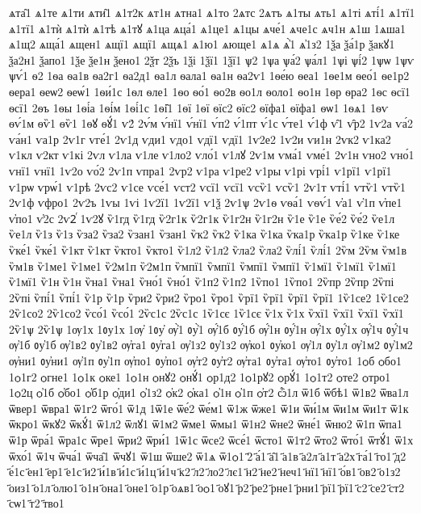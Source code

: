 {ѧта̑1
ѧ1те
ѧ1ти
ѧти̑1
ѧ1т2к
ѧт1н
ѧтна1
ѧ1то
2ѧтс
2ѧтъ
ѧ1ты
ѧть1
ѧ1ті
ѧті́1
ѧ1тї1
ѧ1тї1
ѧ1тѝ
ѧ1тѝ
ѧ1тѣ
ѧ1тꙋ
ѧ1ца
ѧца́1
ѧ1це1
ѧ1цы
ѧче́1
ѧче1с
ѧч1н
ѧ1ш
1ѧша1
ѧ1щ2
ѧща́1
ѧщен1
ѧщї1
ѧщї1
ѧщѧ1
ѧ1ю1
ѧюще1
ѧ1ѧ
ѧ҆̀1
ѧ҆1з2
1ѯа
ѯа́1р
ѯакꙋ1
ѯа2н1
ѯапо1
1ѯе
ѯе1н
ѯено1
2ѯт
2ѯъ
1ѯі
1ѯї1
1ѯї1
ѱ2
1ѱа
ѱа́2
ѱа́л1
1ѱі
ѱі́2
1ѱѡ
1ѱѵ
ѱѵ́1
ѳ2
1ѳа
ѳа1в
ѳа2г1
ѳа2д1
ѳа1л
ѳала1
ѳа1н
ѳа2ѵ1
1ѳе́ю
ѳеа1
1ѳе1м
ѳео́1
ѳе1р2
ѳера1
ѳеѡ2
ѳеѡ́1
1ѳи́1с
1ѳл
ѳле1
1ѳо
ѳо́1
ѳо2в
ѳо1л
ѳоло1
ѳо1н
1ѳр
ѳра2
1ѳс
ѳсї1
ѳсї1
2ѳъ
1ѳы
1ѳі́а
1ѳі́м
1ѳі́1с
1ѳі̑1
1ѳї
1ѳї
ѳїс2
ѳїс2
ѳїфа1
ѳїфа1
ѳѡ1
1ѳѧ1
1ѳѵ
ѳѵ́1м
ѳѷ1
ѳѷ1
1ѳꙋ
ѳꙋ́1
ѵ2́
2ѵ́м
ѵ́нї1
ѵ́нї1
ѵ́п2
ѵ́1пт
ѵ́1с
ѵ́те1
ѵ́1ф
ѵ̑1
ѵ̑р2
1ѵ2а
ѵа́2
ѵа́н1
ѵа1р
2ѵ1г
ѵге́1
2ѵ1д
ѵди1
ѵдо1
ѵдї1
ѵдї1
1ѵ2е2
1ѵ2и
ѵи1н
2ѵк2
ѵ1ка2
ѵ1кл
ѵ2кт
ѵ1кі
2ѵл
ѵ1ла
ѵ1ле
ѵ1ло2
ѵло́1
ѵ1лꙋ
2ѵ1м
ѵма́1
ѵме́1
2ѵ1н
ѵно2
ѵно́1
ѵнї1
ѵнї1
1ѵ2о
ѵо́2
2ѵ1п
ѵпра1
2ѵр2
ѵ1ра
ѵ1ре2
ѵ1ры
ѵ1рі
ѵрі́1
ѵ1рї1
ѵ1рї1
ѵ1рѡ
ѵрѡ́1
ѵ1рѣ
2ѵс2
ѵ1се
ѵсе́1
ѵст2
ѵсї1
ѵсї1
ѵсѷ1
ѵсѷ1
2ѵ1т
ѵті́1
ѵтѷ1
ѵтѷ1
2ѵ1ф
ѵфро1
2ѵ2ъ
1ѵы
1ѵі
1ѵ2ї1
1ѵ2ї1
ѵ1ѯ
2ѵ1ѱ
2ѵ1ѳ
ѵѳа́1
ѵѳѵ́1
ѵ҆а1
ѵ҆1п
ѵ҆пе1
ѵ҆по1
ѵ҆2с
2ѵ2ⷢ
1ѵ2ꙋ
ѷ1гд
ѷ1гд
ѷ2г1к
ѷ2г1к
ѷ1г2н
ѷ1г2н
ѷ1е
ѷ1е
ѷе́2
ѷе́2
ѷе1л
ѷе1л
ѷ1з
ѷ1з
ѷза2
ѷза2
ѷзан1
ѷзан1
ѷк2
ѷк2
ѷ1ка
ѷ1ка
ѷка1р
ѷка1р
ѷ1ке
ѷ1ке
ѷке́1
ѷке́1
ѷ1кт
ѷ1кт
ѷкто1
ѷкто1
ѷ1л2
ѷ1л2
ѷла2
ѷла2
ѷлі́1
ѷлі́1
2ѷм
2ѷм
ѷм1в
ѷм1в
ѷ1ме1
ѷ1ме1
ѷ2м1п
ѷ2м1п
ѷмпї1
ѷмпї1
ѷмпї1
ѷмпї1
ѷ1мї1
ѷ1мї1
ѷ1мї1
ѷ1мї1
ѷ1н
ѷ1н
ѷна1
ѷна1
ѷно́1
ѷно́1
ѷ1п2
ѷ1п2
1ѷпо1
1ѷпо1
2ѷпр
2ѷпр
2ѷпі
2ѷпі
ѷпі́1
ѷпі́1
ѷ1р
ѷ1р
ѷри2
ѷри2
ѷро1
ѷро1
ѷрї1
ѷрї1
ѷрї1
ѷрї1
1ѷ1се2
1ѷ1се2
2ѷ1со2
2ѷ1со2
ѷсо́1
ѷсо́1
2ѷс1с
2ѷс1с
1ѷ1сє
1ѷ1сє
ѷ1х
ѷ1х
ѷхї1
ѷхї1
ѷхї1
ѷхї1
2ѷ1ѱ
2ѷ1ѱ
1ѹ1х
1ᲂу1х
1ѹ҆
1ᲂу҆
ѹ҆̀1
ᲂу҆̀1
ѹ҆́1б
ᲂу҆́1б
ѹ҆́1н
ᲂу҆́1н
ѹ҆́1х
ᲂу҆́1х
ѹ҆́1ч
ᲂу҆́1ч
ѹ҆1б
ᲂу҆1б
ѹ҆1в2
ᲂу҆1в2
ѹ҆га1
ᲂу҆га1
ѹ҆1з2
ᲂу҆1з2
ѹ҆ко1
ᲂу҆ко1
ѹ҆1л
ᲂу҆1л
ѹ҆1м2
ᲂу҆1м2
ѹ҆ни1
ᲂу҆ни1
ѹ҆1п
ᲂу҆1п
ѹ҆по1
ᲂу҆по1
ѹ҆т2
ᲂу҆т2
ѹ҆та1
ᲂу҆та1
ѹ҆то1
ᲂу҆то1
1ѻб
ѻбо1
1ѻ1г2
ѻгне1
1ѻ1к
ѻке1
1ѻ1н
ѻнꙋ2
ѻнꙋ́1
ѻр1д2
1ѻ1рꙋ2
ѻрꙋ́1
1ѻ1т2
ѻте2
ѻтро1
1ѻ2ц
ѻ҆1б
ѻ҆бо1
ѻ҆б1р
ѻ҆ди1
ѻ҆1з2
ѻ҆к2
ѻ҆ка1
ѻ҆1н
ѻ҆1п
ѻ҆т2
ѽ1л
ѿ1б
ѿбѣ1
ѿ1в2
ѿва1л
ѿвер1
ѿвра1
ѿ1г2
ѿго́1
ѿ1д
1ѿ1е
ѿе́2
ѿе́м1
ѿ1ж
ѿже1
ѿ1и
ѿи́1м
ѿи1м
ѿи1т
ѿ1к
ѿкро1
ѿкꙋ2
ѿкꙋ́1
ѿ1л2
ѿлꙋ1
ѿ1м2
ѿме1
ѿмы1
ѿ1н2
ѿне2
ѿне́1
ѿню2
ѿ1п
ѿпа1
ѿ1р
ѿра́1
ѿра1с
ѿре1
ѿри2
ѿри́1
1ѿ1с
ѿсе2
ѿсе́1
ѿсто1
ѿ1т2
ѿто2
ѿто́1
ѿтꙋ́1
ѿ1х
ѿхо́1
ѿ1ч
ѿча́1
ѿча̑1
ѿчꙋ1
ѿ1ш
ѿше2
ѿ1ѧ
ѿ1ѻ1
҃2
҃а́1
҃а̑1
҃а1в
҃а2л
҃а1т
҃а2х
҃га́1
҃го1
҃д2
҃е́1с
҃ен1
҃ер1
҃е1с
҃и2
҃и́1в
҃и́1с
҃и́1ц
҃и́1ч
҃к2
҃л2
҃ло2
҃лє1
҃н2
҃не2
҃неч1
҃нї1
҃нї1
҃о́в1
҃ов2
҃о1з2
҃оиз1
҃о1л
҃олю1
҃о1н
҃она1
҃оне1
҃о1р
҃оѧв1
҃оѻ1
҃оꙋ1
҃р2
҃ре2
҃рне1
҃рни1
҃рї1
҃рї1
҃с2
҃се2
҃ст2
҃сѡ1
҃т2
҃тво1
}

